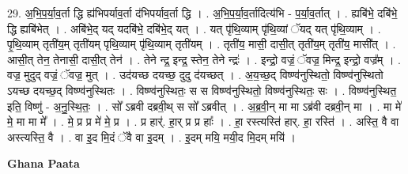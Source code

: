 \documentclass[17pt]{extarticle}
\begin{document}
29. अ॒भि॒प॒र्या॒व॒र्ता द्धि ह्य॑भिपर्याव॒र्ता द॑भिपर्याव॒र्ता द्धि । . अ॒भि॒प॒र्या॒व॒र्तादित्य॑भि - प॒र्या॒व॒र्तात् । . ह्यबि॑भे॒ दबि॑भे॒ द्धि ह्यबि॑भेत् । . अबि॑भे॒द् यद् यदबि॑भे॒ दबि॑भे॒द् यत् । . यत् पृ॑थि॒व्याम् पृ॑थि॒व्यां ॅयद् यत् पृ॑थि॒व्याम् । . पृ॒थि॒व्याम् तृती॑य॒म् तृती॑यम् पृथि॒व्याम् पृ॑थि॒व्याम् तृती॑यम् । . तृती॑य॒ मासी॒ दासी॒त् तृती॑य॒म् तृती॑य॒ मासी᳚त् । . आसी॒त् तेन॒ तेनासी॒ दासी॒त् तेन॑ । . तेने न्द्र॒ इन्द्र॒ स्तेन॒ तेने न्द्रः॑ । . इन्द्रो॒ वज्रं॒ ॅवज्र॒ मिन्द्र॒ इन्द्रो॒ वज्र᳚म् । . वज्र॒ मुदुद् वज्रं॒ ॅवज्र॒ मुत् । . उद॑यच्छ दयच्छ॒ दुदु द॑यच्छत् । . अ॒य॒च्छ॒द् विष्ण्व॑नुस्थितो॒ विष्ण्व॑नुस्थितो ऽयच्छ दयच्छ॒द् विष्ण्व॑नुस्थितः । . विष्ण्व॑नुस्थितः॒ स स विष्ण्व॑नुस्थितो॒ विष्ण्व॑नुस्थितः॒ सः । . विष्ण्व॑नुस्थित॒ इति॒ विष्णु॑ - अ॒नु॒स्थि॒तः॒ । . सो᳚ ऽब्रवी दब्रवी॒थ् स सो᳚ ऽब्रवीत् । . अ॒ब्र॒वी॒न् मा मा ऽब्र॑वी दब्रवी॒न् मा । . मा मे॑ मे॒ मा मा मे᳚ । . मे॒ प्र प्र मे॑ मे॒ प्र । . प्र हार्॑. हा॒र् प्र प्र हाः᳚ । . हा॒ रस्त्यस्ति॑ हार्. हा॒ रस्ति॑ । . अस्ति॒ वै वा अस्त्यस्ति॒ वै । . वा इ॒द मि॒दं ॅवै वा इ॒दम् । . इ॒दम् मयि॒ मयी॒द मि॒दम् मयि॑ । \newline

\textbf{Ghana Paata } \newline
\end{document}
